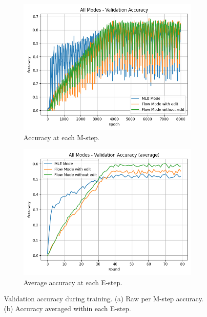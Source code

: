 \begin{figure}[H]
    \centering
    \begin{subfigure}[b]{0.46\textwidth}
        \centering
        \includegraphics[width=\textwidth]{Images/accuracy_all_modes_validation.png}
        \caption{Accuracy at each M-step.}
        \label{fig:validation-acc-m}
    \end{subfigure}\hfill
    \begin{subfigure}[b]{0.46\textwidth}
        \centering
        \includegraphics[width=\textwidth]{Images/average_accuracy_all_modes_validation.png}
        \caption{Average accuracy at each E-step.}
        \label{fig:validation-acc-e}
    \end{subfigure}
    \caption{Validation accuracy during training. (a) Raw per M-step accuracy. \\ 
    (b) Accuracy averaged within each E-step.}
    \label{fig:validation-acc}
\end{figure}

